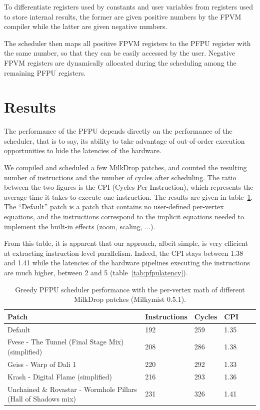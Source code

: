 \documentclass[a4paper,11pt]{kthesis}
\begin{document}
To differentiate registers used by constants and user variables from registers used to store internal results, the former are given positive numbers by the FPVM compiler while the latter are given negative numbers.

The scheduler then maps all positive FPVM registers to the PFPU register with the same number, so that they can be easily accessed by the user. Negative FPVM registers are dynamically allocated during the scheduling among the remaining PFPU registers.

\section{Results}
The performance of the PFPU depends directly on the performance of the scheduler, that is to say, its ability to take advantage of out-of-order execution opportunities to hide the latencies of the hardware.

We compiled and scheduled a few MilkDrop patches, and counted the resulting number of instructions and the number of cycles after scheduling. The ratio between the two figures is the CPI (Cycles Per Instruction), which represents the average time it takes to execute one instruction. The results are given in table~\ref{tab:gfpusperf}. The ``Default'' patch is a patch that contains no user-defined per-vertex equations, and the instructions correspond to the implicit equations needed to implement the built-in effects (zoom, scaling, ...).

From this table, it is apparent that our approach, albeit simple, is very efficient at extracting instruction-level parallelism. Indeed, the CPI stays between 1.38 and 1.41 while the latencies of the hardware pipelines executing the instructions are much higher, between 2 and 5 (table~\ref{tab:pfpulatency}).

\begin{table}
\centering
\begin{tabularx}{13cm}{|X|l|l|l|l|l|}
\hline
\textbf{Patch} & \textbf{Instructions} & \textbf{Cycles} & \textbf{CPI} \\
\hline
Default & 192 & 259 & 1.35 \\
\hline
Fvese - The Tunnel (Final Stage Mix) (simplified) & 208 & 286 & 1.38 \\
\hline
Geiss - Warp of Dali 1 & 220 & 292 & 1.33 \\
\hline
Krash - Digital Flame (simplified) & 216 & 293 & 1.36 \\
\hline
Unchained \& Rovastar - Wormhole Pillars (Hall of Shadows mix) & 231 & 326 & 1.41 \\
\hline
\end{tabularx}
\caption{Greedy PFPU scheduler performance with the per-vertex math of different MilkDrop patches (Milkymist 0.5.1).}\label{tab:gfpusperf}
\end{table}
\end{document}

